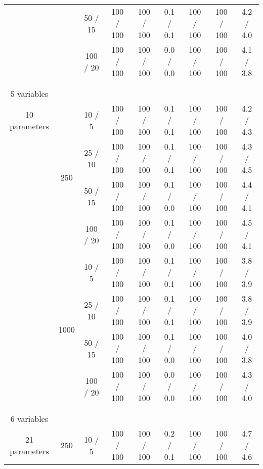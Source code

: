 \documentclass[twoside,11pt]{article}
\begin{document}
\begin{table}[H]
\begin{tabular}{  c | c | c || c | c | c || c | c | c }
& & 50 / 15 & 100 / 100 & 100 / 100 & 0.1 / 0.1 & 100 / 100 & 100 / 100 & 4.2 / 4.0 \\

& & 100 / 20 & 100 / 100 & 100 / 100 & 0.0 / 0.0 & 100 / 100 & 100 / 100 & 4.1 / 3.8 \\

\hhline {=|=|=||=|=|=||=|=|=}

\multirow{8}{*}{\thead{\textbf{earthquake} \\ \\ 5 variables \\ 10 parameters}} & \multirow{4}{*}{250} 

& 10 / 5 & 100 / 100 & 100 / 100  & 0.1 / 0.1 & 100 / 100 & 100 / 100 & 4.2 / 4.3 \\

& & 25 / 10  & 100 / 100 & 100 / 100 & 0.1 / 0.1 & 100 / 100 & 100 / 100 & 4.3 / 4.5 \\
	
& & 50 / 15 & 100 / 100 & 100 / 100 & 0.1 / 0.0 & 100 / 100 & 100 / 100 & 4.4 / 4.1 \\

& & 100 / 20 & 100 / 100 & 100 / 100 & 0.1 / 0.0 & 100 / 100 & 100 / 100 & 4.5 / 4.1 \\

\hhline {~|-|-||-|-|-||-|-|-}

& \multirow{4}{*}{1000}

& 10 / 5 & 100 / 100 & 100 / 100 & 0.1 / 0.1 & 100 / 100 & 100 / 100 & 3.8 / 3.9 \\

& & 25 / 10  & 100 / 100 & 100 / 100 & 0.1 / 0.1 & 100 / 100 & 100 / 100 & 3.8 / 3.9 \\
	
& & 50 / 15 & 100 / 100 & 100 / 100 & 0.1 / 0.0 & 100 / 100 & 100 / 100 & 4.0 / 3.8 \\

& & 100 / 20 & 100 / 100 & 100 / 100 & 0.0 / 0.0 & 100 / 100 & 100 / 100 & 4.3 / 4.0 \\

\hhline {=|=|=||=|=|=||=|=|=}


\multirow{8}{*}{\thead{\textbf{survey} \\ \\ 6 variables \\ 21 parameters}} & \multirow{4}{*}{250} 
& 10 / 5 & 100 / 100 & 100 / 100  & 0.2 / 0.1 & 100 / 100 & 100 / 100 & 4.7 / 4.6 \\


\end{tabular}
\end{table}
\end{document}
